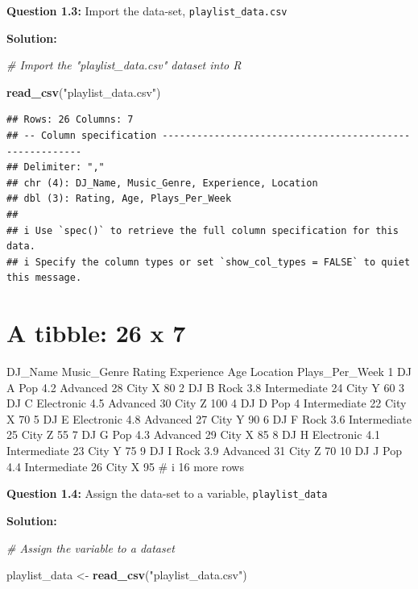 \documentclass[
]{article}
\newenvironment{Shaded}{\begin{snugshade}}{\end{snugshade}}
\newcommand{\CommentTok}[1]{\textcolor[rgb]{0.56,0.35,0.01}{\textit{#1}}}
\newcommand{\FunctionTok}[1]{\textcolor[rgb]{0.13,0.29,0.53}{\textbf{#1}}}
\newcommand{\NormalTok}[1]{#1}
\newcommand{\OtherTok}[1]{\textcolor[rgb]{0.56,0.35,0.01}{#1}}
\newcommand{\StringTok}[1]{\textcolor[rgb]{0.31,0.60,0.02}{#1}}
\begin{document}
\textbf{Question 1.3:} Import the data-set, \texttt{playlist\_data.csv}

\textbf{Solution:}

\begin{Shaded}
\begin{Highlighting}[]
\CommentTok{\# Import the "playlist\_data.csv" dataset into R }

\FunctionTok{read\_csv}\NormalTok{(}\StringTok{"playlist\_data.csv"}\NormalTok{) }
\end{Highlighting}
\end{Shaded}

\begin{verbatim}
## Rows: 26 Columns: 7
## -- Column specification --------------------------------------------------------
## Delimiter: ","
## chr (4): DJ_Name, Music_Genre, Experience, Location
## dbl (3): Rating, Age, Plays_Per_Week
## 
## i Use `spec()` to retrieve the full column specification for this data.
## i Specify the column types or set `show_col_types = FALSE` to quiet this message.
\end{verbatim}

\hypertarget{a-tibble-26-x-7}{%
\section{A tibble: 26 x 7}\label{a-tibble-26-x-7}}

DJ\_Name Music\_Genre Rating Experience Age Location Plays\_Per\_Week 1
DJ A Pop 4.2 Advanced 28 City X 80 2 DJ B Rock 3.8 Intermediate 24 City
Y 60 3 DJ C Electronic 4.5 Advanced 30 City Z 100 4 DJ D Pop 4
Intermediate 22 City X 70 5 DJ E Electronic 4.8 Advanced 27 City Y 90 6
DJ F Rock 3.6 Intermediate 25 City Z 55 7 DJ G Pop 4.3 Advanced 29 City
X 85 8 DJ H Electronic 4.1 Intermediate 23 City Y 75 9 DJ I Rock 3.9
Advanced 31 City Z 70 10 DJ J Pop 4.4 Intermediate 26 City X 95 \# i 16
more rows

\textbf{Question 1.4:} Assign the data-set to a variable,
\texttt{playlist\_data}

\textbf{Solution:}

\begin{Shaded}
\begin{Highlighting}[]
\CommentTok{\# Assign the variable to a dataset }

\NormalTok{playlist\_data }\OtherTok{\textless{}{-}} \FunctionTok{read\_csv}\NormalTok{(}\StringTok{"playlist\_data.csv"}\NormalTok{) }
\end{Highlighting}
\end{Shaded}
\end{document}
